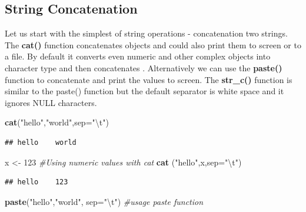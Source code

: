 \documentclass[]{book}
\newenvironment{Shaded}{\begin{snugshade}}{\end{snugshade}}
\newcommand{\KeywordTok}[1]{\textcolor[rgb]{0.13,0.29,0.53}{\textbf{{#1}}}}
\newcommand{\DataTypeTok}[1]{\textcolor[rgb]{0.13,0.29,0.53}{{#1}}}
\newcommand{\DecValTok}[1]{\textcolor[rgb]{0.00,0.00,0.81}{{#1}}}
\newcommand{\CharTok}[1]{\textcolor[rgb]{0.31,0.60,0.02}{{#1}}}
\newcommand{\StringTok}[1]{\textcolor[rgb]{0.31,0.60,0.02}{{#1}}}
\newcommand{\CommentTok}[1]{\textcolor[rgb]{0.56,0.35,0.01}{\textit{{#1}}}}
\newcommand{\NormalTok}[1]{{#1}}
\begin{document}
\subsection{String Concatenation}\label{string-concatenation}

Let us start with the simplest of string operations - concatenation two
strings. The \textbf{cat()} function concatenates objects and could also
print them to screen or to a file. By default it converts even numeric
and other complex objects into character type and then concatenates .
Alternatively we can use the \textbf{paste()} function to concatenate
and print the values to screen. The \textbf{str\_c()} function is
similar to the paste() function but the default separator is white space
and it ignores NULL characters.

\begin{Shaded}
\begin{Highlighting}[]
\KeywordTok{cat}\NormalTok{(}\StringTok{"hello"}\NormalTok{,}\StringTok{"world"}\NormalTok{,}\DataTypeTok{sep=}\StringTok{"}\CharTok{\textbackslash{}t}\StringTok{"}\NormalTok{)}
\end{Highlighting}
\end{Shaded}

\begin{verbatim}
## hello    world
\end{verbatim}

\begin{Shaded}
\begin{Highlighting}[]
\NormalTok{x <-}\StringTok{ }\DecValTok{123} \CommentTok{#Using numeric values with cat}
\KeywordTok{cat} \NormalTok{(}\StringTok{"hello"}\NormalTok{,x,}\DataTypeTok{sep=}\StringTok{"}\CharTok{\textbackslash{}t}\StringTok{"}\NormalTok{)}
\end{Highlighting}
\end{Shaded}

\begin{verbatim}
## hello    123
\end{verbatim}

\begin{Shaded}
\begin{Highlighting}[]
\KeywordTok{paste}\NormalTok{(}\StringTok{"hello"}\NormalTok{,}\StringTok{"world"}\NormalTok{, }\DataTypeTok{sep=}\StringTok{"}\CharTok{\textbackslash{}t}\StringTok{"}\NormalTok{) }\CommentTok{#usage paste function}
\end{Highlighting}
\end{Shaded}
\end{document}
